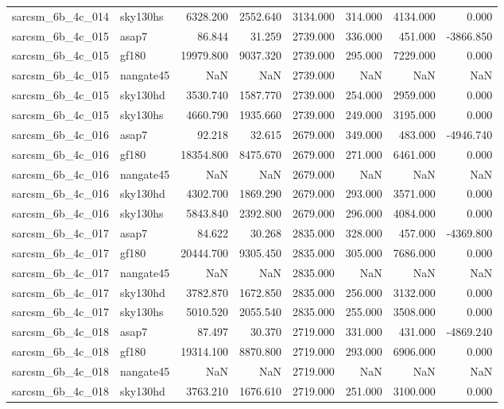 \begin{tabular}{llrrrrrr}
sarcsm\_6b\_4c\_014 & sky130hs & 6328.200 & 2552.640 & 3134.000 & 314.000 & 4134.000 & 0.000 \\
sarcsm\_6b\_4c\_015 & asap7 & 86.844 & 31.259 & 2739.000 & 336.000 & 451.000 & -3866.850 \\
sarcsm\_6b\_4c\_015 & gf180 & 19979.800 & 9037.320 & 2739.000 & 295.000 & 7229.000 & 0.000 \\
sarcsm\_6b\_4c\_015 & nangate45 & NaN & NaN & 2739.000 & NaN & NaN & NaN \\
sarcsm\_6b\_4c\_015 & sky130hd & 3530.740 & 1587.770 & 2739.000 & 254.000 & 2959.000 & 0.000 \\
sarcsm\_6b\_4c\_015 & sky130hs & 4660.790 & 1935.660 & 2739.000 & 249.000 & 3195.000 & 0.000 \\
sarcsm\_6b\_4c\_016 & asap7 & 92.218 & 32.615 & 2679.000 & 349.000 & 483.000 & -4946.740 \\
sarcsm\_6b\_4c\_016 & gf180 & 18354.800 & 8475.670 & 2679.000 & 271.000 & 6461.000 & 0.000 \\
sarcsm\_6b\_4c\_016 & nangate45 & NaN & NaN & 2679.000 & NaN & NaN & NaN \\
sarcsm\_6b\_4c\_016 & sky130hd & 4302.700 & 1869.290 & 2679.000 & 293.000 & 3571.000 & 0.000 \\
sarcsm\_6b\_4c\_016 & sky130hs & 5843.840 & 2392.800 & 2679.000 & 296.000 & 4084.000 & 0.000 \\
sarcsm\_6b\_4c\_017 & asap7 & 84.622 & 30.268 & 2835.000 & 328.000 & 457.000 & -4369.800 \\
sarcsm\_6b\_4c\_017 & gf180 & 20444.700 & 9305.450 & 2835.000 & 305.000 & 7686.000 & 0.000 \\
sarcsm\_6b\_4c\_017 & nangate45 & NaN & NaN & 2835.000 & NaN & NaN & NaN \\
sarcsm\_6b\_4c\_017 & sky130hd & 3782.870 & 1672.850 & 2835.000 & 256.000 & 3132.000 & 0.000 \\
sarcsm\_6b\_4c\_017 & sky130hs & 5010.520 & 2055.540 & 2835.000 & 255.000 & 3508.000 & 0.000 \\
sarcsm\_6b\_4c\_018 & asap7 & 87.497 & 30.370 & 2719.000 & 331.000 & 431.000 & -4869.240 \\
sarcsm\_6b\_4c\_018 & gf180 & 19314.100 & 8870.800 & 2719.000 & 293.000 & 6906.000 & 0.000 \\
sarcsm\_6b\_4c\_018 & nangate45 & NaN & NaN & 2719.000 & NaN & NaN & NaN \\
sarcsm\_6b\_4c\_018 & sky130hd & 3763.210 & 1676.610 & 2719.000 & 251.000 & 3100.000 & 0.000 \\

\end{tabular}
